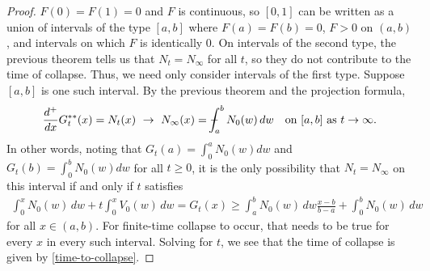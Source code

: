 \documentclass[10pt,a4paper]{amsart}
\numberwithin{equation}{section}
\def\Xint#1{\mathchoice
{\XXint\displaystyle\textstyle{#1}}%
{\XXint\textstyle\scriptstyle{#1}}%
{\XXint\scriptstyle\scriptscriptstyle{#1}}%
{\XXint\scriptscriptstyle\scriptscriptstyle{#1}}%
   \!\int}
\def\XXint#1#2#3{{\setbox0=\hbox{$#1{#2#3}{\int}$}
\vcenter{\hbox{$#2#3$}}\kern-.5\wd0}}
\def\dashint{\Xint-}
\begin{document}
\begin{proof}
    $F(0)=F(1)=0$ and $F$ is continuous, so $[0,1]$ can be written as a union of intervals of the type $[a,b]$ where $F(a)=F(b)=0$, $F>0$ on $(a,b)$, and intervals on which $F$ is identically $0$. On intervals of the second type, the previous theorem tells us that $N_t=N_\infty$ for all $t$, so they do not contribute to the time of collapse. Thus, we need only consider intervals of the first type. Suppose $[a,b]$ is one such interval. By the previous theorem and the projection formula,  
    \begin{align*}
        \frac{d^+}{dx}G_t^{**}(x)=N_t(x) \ \to \ N_\infty(x)=\dashint_a^b N_0(w) \, dw \quad \text{on }[a,b]\text{ as }t\to\infty. 
    \end{align*}
    In other words, noting that $G_t(a)=\int_0^a N_0(w)dw$ and $G_t(b)=\int_0^b N_0(w)dw$ for all $t\geq0$, it is the only possibility that $N_t=N_\infty$ on this interval if and only if $t$ satisfies
    \begin{align*}
        \int_0^x N_0(w) \, dw+t\int_0^x V_0(w) \, dw=G_t(x)\geq\int_a^b N_0(w) \, dw\frac{x-b}{b-a}+\int_0^b N_0(w) \, dw 
    \end{align*}
    for all $x\in(a,b)$. For finite-time collapse to occur, that needs to be true for every $x$ in every such interval. Solving for $t$, we see that the time of collapse is given by \eqref{time-to-collapse}. \qedhere 
    



\end{proof}
\end{document}
